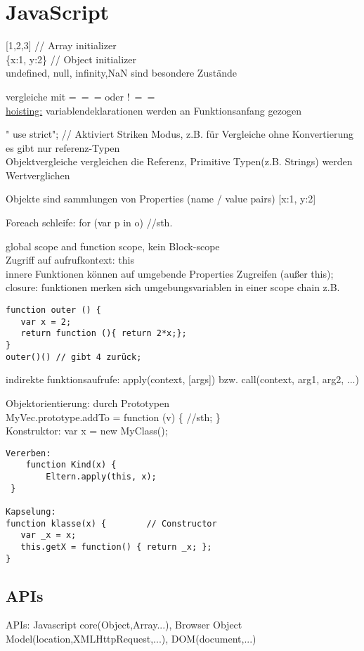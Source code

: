 \section*{JavaScript}
[1,2,3] // Array initializer \\
\{x:1, y:2\} // Object initializer \\
undefined, null, infinity,NaN sind besondere Zustände

vergleiche mit =~\!=~\!= oder !~\!=~\!= \\
\underline{hoisting:} variablendeklarationen werden an Funktionsanfang gezogen

" use strict"; // Aktiviert Striken Modus, z.B. für Vergleiche ohne Konvertierung \\
es gibt nur referenz-Typen \\
Objektvergleiche vergleichen die Referenz, Primitive Typen(z.B. Strings) werden Wertverglichen

Objekte sind sammlungen von Properties (name / value pairs) [x:1, y:2]

Foreach schleife: for (var p in o){ //sth. }

global scope and function scope, kein Block-scope\\ 
Zugriff auf aufrufkontext: this  \\
innere Funktionen können auf umgebende Properties Zugreifen (außer this); \\
closure: funktionen merken sich umgebungsvariablen in einer scope chain
z.B. 
\begin{verbatim}
function outer () {
   var x = 2;
   return function (){ return 2*x;};
}
outer()() // gibt 4 zurück;
\end{verbatim}

indirekte funktionsaufrufe: apply(context, [args]) bzw. call(context, arg1, arg2, ...)
 
 Objektorientierung: durch Prototypen \\
 MyVec.prototype.addTo = function (v) \{ //sth; \}\\
 Konstruktor: var x = new MyClass();
 
\begin{verbatim}
Vererben:
 	function Kind(x) {
 		Eltern.apply(this, x);
 }
 
Kapselung: 
function klasse(x) {		// Constructor
   var _x = x;
   this.getX = function() { return _x; };
}

\end{verbatim}


\subsection*{APIs}
APIs: Javascript core(Object,Array...), Browser Object Model(location,XMLHttpRequest,...), DOM(document,...)

